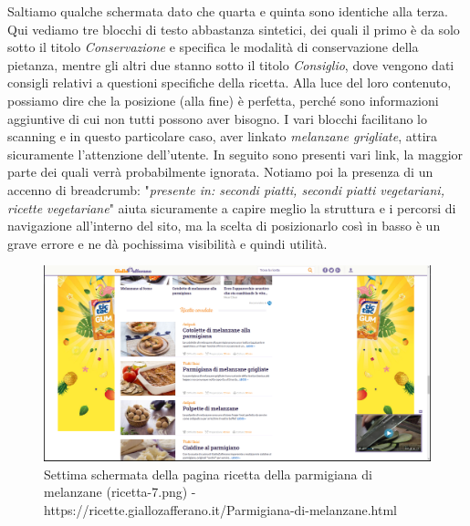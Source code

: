 Saltiamo qualche schermata dato che quarta e quinta sono identiche alla terza. Qui vediamo tre blocchi di testo abbastanza sintetici, dei quali il primo è da solo sotto il titolo \textit{Conservazione} e specifica le modalità di conservazione della pietanza, mentre gli altri due stanno sotto il titolo \textit{Consiglio}, dove vengono dati consigli relativi a questioni specifiche della ricetta. Alla luce del loro contenuto, possiamo dire che la posizione (alla fine) è  perfetta, perché sono informazioni aggiuntive di cui non tutti possono aver bisogno.
I vari blocchi facilitano lo scanning e in questo particolare caso, aver linkato \textit{melanzane grigliate}, attira sicuramente l'attenzione dell'utente.
In seguito sono presenti vari link, la maggior parte dei quali verrà probabilmente ignorata.
Notiamo poi la presenza di un accenno di breadcrumb: "\textit{presente in: secondi piatti, secondi piatti vegetariani, ricette vegetariane}" aiuta sicuramente a capire meglio la struttura e i percorsi di navigazione all'interno del sito, ma la scelta di posizionarlo così in basso è un grave errore e ne dà pochissima visibilità e quindi utilità.
\clearpage

\begin{figure}[h!]
	\centerline{
	\includegraphics[scale=0.2]{images/ricetta-7.png}}
	\caption{Settima schermata della pagina ricetta della parmigiana di melanzane (ricetta-7.png) -\newline https://ricette.giallozafferano.it/Parmigiana-di-melanzane.html}
	\label{fig:ricetta-7}
\end{figure}

